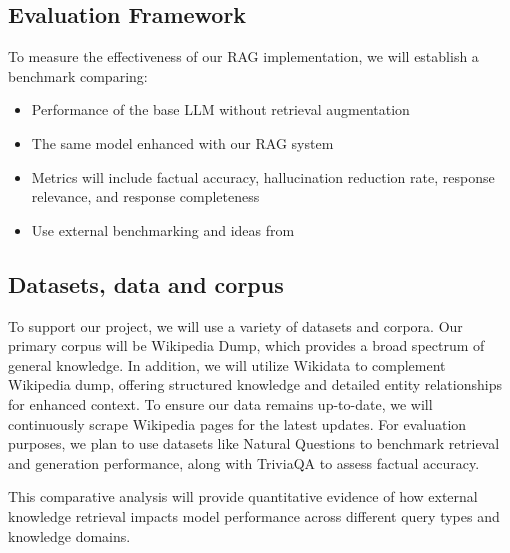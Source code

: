 \documentclass[fleqn,moreauthors,10pt]{ds_report}
\begin{document}
\subsection*{Evaluation Framework}
To measure the effectiveness of our RAG implementation, we will establish a benchmark comparing:

\begin{itemize}
\item Performance of the base LLM without retrieval augmentation
\item The same model enhanced with our RAG system
\item Metrics will include factual accuracy, hallucination reduction rate, response relevance, and response completeness
\item Use external benchmarking and ideas from \cite{chen} 
\end{itemize}

\subsection*{Datasets, data and corpus}
To support our project, we will use a variety of datasets and corpora. Our primary corpus will be Wikipedia Dump, which provides a broad spectrum of general knowledge. In addition, we will utilize Wikidata to complement Wikipedia dump, offering structured knowledge and detailed entity relationships for enhanced context. To ensure our data remains up-to-date, we will continuously scrape Wikipedia pages for the latest updates. For evaluation purposes, we plan to use datasets like Natural Questions to benchmark retrieval and generation performance, along with TriviaQA to assess factual accuracy.  

This comparative analysis will provide quantitative evidence of how external knowledge retrieval impacts model performance across different query types and knowledge domains.



\end{document}
